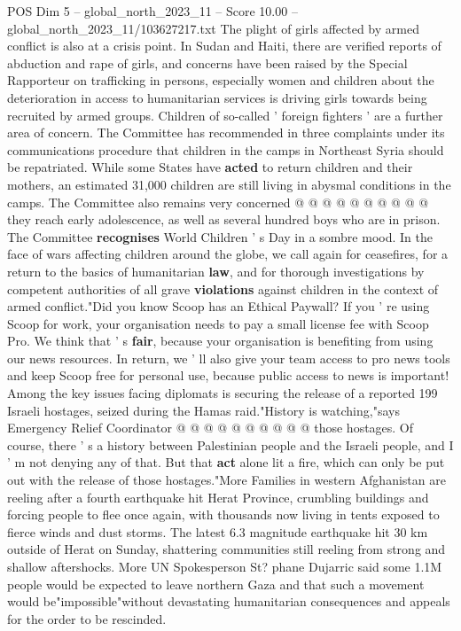 \begin{textsample}{POS Dim 5 – global\_north\_2023\_11 – Score 10.00 – global\_north\_2023\_11/103627217.txt}
The plight of girls affected by armed conflict is also at a crisis point.
In Sudan and Haiti, there are verified reports of abduction and rape of girls, and concerns have been raised by the Special Rapporteur on trafficking in persons, especially women and children about the deterioration in access to humanitarian services is driving girls towards being recruited by armed groups.
Children of so-called ' foreign fighters ' are a further area of concern.
The Committee has recommended in three complaints under its communications procedure that children in the camps in Northeast Syria should be repatriated.
While some States have \textbf{acted} to return children and their mothers, an estimated 31,000 children are still living in abysmal conditions in the camps.
The Committee also remains very concerned @ @ @ @ @ @ @ @ @ @ they reach early adolescence, as well as several hundred boys who are in prison.
The Committee \textbf{recognises} World Children ' s Day in a sombre mood.
In the face of wars affecting children around the globe, we call again for ceasefires, for a return to the basics of humanitarian \textbf{law}, and for thorough investigations by competent authorities of all grave \textbf{violations} against children in the context of armed conflict."Did you know Scoop has an Ethical Paywall?
If you ' re using Scoop for work, your organisation needs to pay a small license fee with Scoop Pro.
We think that ' s \textbf{fair}, because your organisation is benefiting from using our news resources.
In return, we ' ll also give your team access to pro news tools and keep Scoop free for personal use, because public access to news is important!
Among the key issues facing diplomats is securing the release of a reported 199 Israeli hostages, seized during the Hamas raid."History is watching,"says Emergency Relief Coordinator @ @ @ @ @ @ @ @ @ @ those hostages.
Of course, there ' s a history between Palestinian people and the Israeli people, and I ' m not denying any of that.
But that \textbf{act} alone lit a fire, which can only be put out with the release of those hostages."More Families in western Afghanistan are reeling after a fourth earthquake hit Herat Province, crumbling buildings and forcing people to flee once again, with thousands now living in tents exposed to fierce winds and dust storms.
The latest 6.3 magnitude earthquake hit 30 km outside of Herat on Sunday, shattering communities still reeling from strong and shallow aftershocks.
More UN Spokesperson St? phane Dujarric said some 1.1M people would be expected to leave northern Gaza and that such a movement would be"impossible"without devastating humanitarian consequences and appeals for the order to be rescinded.

\end{textsample}

